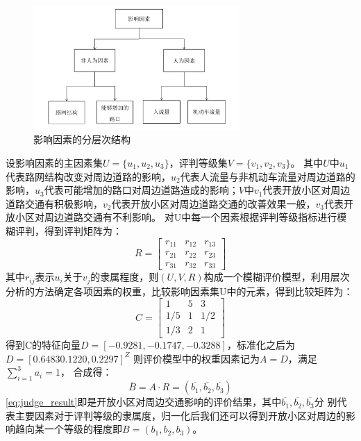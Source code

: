 \documentclass[fontset=windows,a4paper,12pt]{ctexart}
\begin{document}
			\begin{figure}[!htbp]
				\centering
				\includegraphics[width=0.7\textwidth]{pic/judge_result.pdf}
				\caption{影响因素的分层次结构}
				\label{fig:layer_struct}
			\end{figure}
			设影响因素的主因素集$ U=\{u_1,u_2,u_3\} $，评判等级集$ V=\{v_1,v_2,v_3\} $。
			其中$ U $中$ u_1 $代表路网结构改变对周边道路的影响，$ u_2 $代表人流量与非机动车流量对周边道路的影响，$ u_3 $代表可能增加的路口对周边道路造成的影响；$ V $中$ v_1 $代表开放小区对周边道路交通有积极影响，$ v_2 $代表开放小区对周边道路交通的改善效果一般，$ v_3 $代表开放小区对周边道路交通有不利影响。
			对U中每一个因素根据评判等级指标进行模糊评判，得到评判矩阵为：
			$$
				R=\left[
				\begin{array}{cccc}
					r_{11} & r_{12} & r_{13}\\
					r_{21} & r_{22} & r_{23}\\
					r_{31} & r_{32} & r_{33}
				\end{array}
				\right]
			$$
			其中$ r_{ij} $表示$ u_i $关于$ v_j $的隶属程度，则$ (U,V,R) $构成一个模糊评价模型，利用层次分析的方法确定各项因素的权重，比较影响因素集U中的元素，得到比较矩阵为：
			$$
				C=\left[
				\begin{array}{cccc}
					1 & 5 & 3\\
					1/5 & 1 & 1/2\\
					1/3 & 2 & 1
				\end{array}
				\right]
			$$
			得到C的特征向量$ D=[-0.9281,-0.1747,-0.3288] $，标准化之后为$ D=[0.6483 0.1220,0.2297]^Z $
			则评价模型中的权重因素记为$ A=D $，满足$ \sum_{i=1}^{3}a_i=1 $，
			合成得：
			\begin{equation}
				\overline{B}=A \cdot R=(\overline{b_1},\overline{b_2},\overline{b_3}) 
				\label{eq:judge_result}
			\end{equation}
			\ref{eq:judge_result}即是开放小区对周边交通影响的评价结果，其中$\overline{b_1},\overline{b_2},\overline{b_3}$分
			别代表主要因素对于评判等级的隶属度，归一化后我们还可以得到开放小区对周边的影响趋向某一个等级的程度即$ B=(b_1,b_2,b_3) $。
\end{document}
